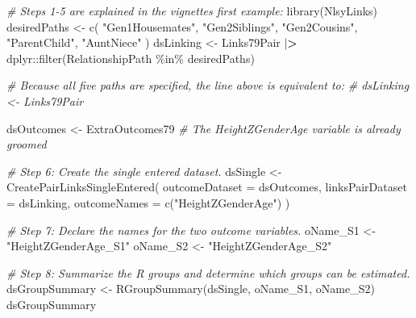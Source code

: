 \documentclass[smallextended]{svjour3}       %
\newenvironment{Shaded}{\begin{snugshade}}{\end{snugshade}}
\newcommand{\AttributeTok}[1]{\textcolor[rgb]{0.77,0.63,0.00}{#1}}
\newcommand{\CommentTok}[1]{\textcolor[rgb]{0.56,0.35,0.01}{\textit{#1}}}
\newcommand{\ErrorTok}[1]{\textcolor[rgb]{0.64,0.00,0.00}{\textbf{#1}}}
\newcommand{\FunctionTok}[1]{\textcolor[rgb]{0.00,0.00,0.00}{#1}}
\newcommand{\NormalTok}[1]{#1}
\newcommand{\OtherTok}[1]{\textcolor[rgb]{0.56,0.35,0.01}{#1}}
\newcommand{\SpecialCharTok}[1]{\textcolor[rgb]{0.00,0.00,0.00}{#1}}
\newcommand{\StringTok}[1]{\textcolor[rgb]{0.31,0.60,0.02}{#1}}
\begin{document}
\begin{Shaded}
\begin{Highlighting}[]
\CommentTok{\# Steps 1{-}5 are explained in the vignette\textquotesingle{}s first example:}
\FunctionTok{library}\NormalTok{(NlsyLinks)}
\NormalTok{desiredPaths }\OtherTok{\textless{}{-}}
  \FunctionTok{c}\NormalTok{(}
    \StringTok{"Gen1Housemates"}\NormalTok{,}
    \StringTok{"Gen2Siblings"}\NormalTok{, }\StringTok{"Gen2Cousins"}\NormalTok{,}
    \StringTok{"ParentChild"}\NormalTok{, }\StringTok{"AuntNiece"}
\NormalTok{  )}
\NormalTok{dsLinking }\OtherTok{\textless{}{-}}
\NormalTok{  Links79Pair }\SpecialCharTok{|}\ErrorTok{\textgreater{}}
\NormalTok{  dplyr}\SpecialCharTok{::}\FunctionTok{filter}\NormalTok{(RelationshipPath }\SpecialCharTok{\%in\%}\NormalTok{ desiredPaths)}

\CommentTok{\# Because all five paths are specified, the line above is equivalent to:}
\CommentTok{\# dsLinking \textless{}{-} Links79Pair}

\NormalTok{dsOutcomes }\OtherTok{\textless{}{-}}\NormalTok{ ExtraOutcomes79}
\CommentTok{\# The HeightZGenderAge variable is already groomed}

\CommentTok{\# Step 6: Create the single entered dataset.}
\NormalTok{dsSingle }\OtherTok{\textless{}{-}}
  \FunctionTok{CreatePairLinksSingleEntered}\NormalTok{(}
    \AttributeTok{outcomeDataset   =}\NormalTok{ dsOutcomes,}
    \AttributeTok{linksPairDataset =}\NormalTok{ dsLinking,}
    \AttributeTok{outcomeNames     =} \FunctionTok{c}\NormalTok{(}\StringTok{"HeightZGenderAge"}\NormalTok{)}
\NormalTok{  )}

\CommentTok{\# Step 7: Declare the names for the two outcome variables.}
\NormalTok{oName\_S1 }\OtherTok{\textless{}{-}} \StringTok{"HeightZGenderAge\_S1"}
\NormalTok{oName\_S2 }\OtherTok{\textless{}{-}} \StringTok{"HeightZGenderAge\_S2"}

\CommentTok{\# Step 8: Summarize the R groups and determine which groups can be estimated.}
\NormalTok{dsGroupSummary }\OtherTok{\textless{}{-}} \FunctionTok{RGroupSummary}\NormalTok{(dsSingle, oName\_S1, oName\_S2)}
\NormalTok{dsGroupSummary}
\end{Highlighting}
\end{Shaded}
\end{document}
